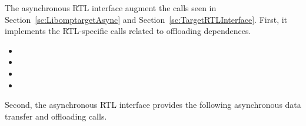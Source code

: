 The asynchronous RTL interface augment the calls seen in Section~\ref{sc:LibomptargetAsync} and Section~\ref{sc:TargetRTLInterface}. First, it implements the RTL-specific calls related to offloading dependences.

\begin{itemize}
  \item {} 
  \item {} 
  \item {} 
  \item {} 
 \end{itemize}

Second, the asynchronous RTL interface provides the following asynchronous data transfer and offloading calls. 

\begin{comment}
\begin{itemize}
  \item \code{int32_t __tgt_rtl_async_data_submit(int32_t device_id, void *target_ptr, void *host_ptr, int64_t size, int32_t num_dep_events, tgt_event_t *dep_events, tgt_event_t *completion_event)} 
  \item \code{int32_t __tgt_rtl_async_data_retrieve(int32_t device_id, void *host_ptr, void *target_ptr, int64_t size, int32_t num_dep_events, tgt_event_t *dep_events, tgt_event_t *completion_event)} 
  \item \code{int32_t __tgt_rtl_async_run_target_region(int32_t device_id, void *target_entry_ptr, void **target_vars_ptr, int32_t arg_num, int32_t num_dep_events, tgt_event_t *dep_events, tgt_event_t *completion_event)} 
  \item \code{int32_t __tgt_rtl_async_run_target_team_region(int32_t device_id, void *target_entry_ptr, void **target_vars_ptr, int32_t arg_num, int32_t num_teams, int32_t thread_limit, int32_t num_dep_events, tgt_event_t *dep_events, tgt_event_t *completion_event)} 
  \end{itemize}
  
  Note that the \code{dep_events} synchronization event may now also include dependences on the completion of data transfers initiated by libomptarget.so.
  \end{comment}
  